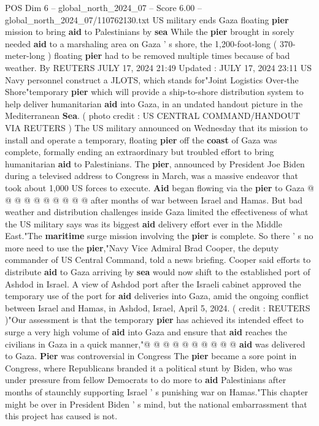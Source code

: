 \begin{textsample}{POS Dim 6 – global\_north\_2024\_07 – Score 6.00 – global\_north\_2024\_07/110762130.txt}  \label{ex:f6_pos_309}
US military ends Gaza floating \textbf{pier} mission to bring \textbf{aid} to Palestinians by \textbf{sea} While the \textbf{pier} brought in sorely needed \textbf{aid} to a marshaling area on Gaza ' s shore, the 1,200-foot-long ( 370-meter-long ) floating \textbf{pier} had to be removed multiple times because of bad weather.
By REUTERS JULY 17, 2024 21:49 Updated : JULY 17, 2024 23:11 US Navy personnel construct a JLOTS, which stands for"Joint Logistics Over-the Shore"temporary \textbf{pier} which will provide a ship-to-shore distribution system to help deliver humanitarian \textbf{aid} into Gaza, in an undated handout picture in the Mediterranean \textbf{Sea}. ( photo credit : US CENTRAL COMMAND/HANDOUT VIA REUTERS ) The US military announced on Wednesday that its mission to install and operate a temporary, floating \textbf{pier} off the \textbf{coast} of Gaza was complete, formally ending an extraordinary but troubled effort to bring humanitarian \textbf{aid} to Palestinians.
The \textbf{pier}, announced by President Joe Biden during a televised address to Congress in March, was a massive endeavor that took about 1,000 US forces to execute. \textbf{Aid} began flowing via the \textbf{pier} to Gaza @ @ @ @ @ @ @ @ @ @ after months of war between Israel and Hamas.
But bad weather and distribution challenges inside Gaza limited the effectiveness of what the US military says was its biggest \textbf{aid} delivery effort ever in the Middle East."The \textbf{maritime} surge mission involving the \textbf{pier} is complete.
So there ' s no more need to use the \textbf{pier},"Navy Vice Admiral Brad Cooper, the deputy commander of US Central Command, told a news briefing.
Cooper said efforts to distribute \textbf{aid} to Gaza arriving by \textbf{sea} would now shift to the established port of Ashdod in Israel.
A view of Ashdod port after the Israeli cabinet approved the temporary use of the port for \textbf{aid} deliveries into Gaza, amid the ongoing conflict between Israel and Hamas, in Ashdod, Israel, April 5, 2024. ( credit : REUTERS )"Our assessment is that the temporary \textbf{pier} has achieved its intended effect to surge a very high volume of \textbf{aid} into Gaza and ensure that \textbf{aid} reaches the civilians in Gaza in a quick manner,"@ @ @ @ @ @ @ @ @ @ \textbf{aid} was delivered to Gaza. \textbf{Pier} was controversial in Congress The \textbf{pier} became a sore point in Congress, where Republicans branded it a political stunt by Biden, who was under pressure from fellow Democrats to do more to \textbf{aid} Palestinians after months of staunchly supporting Israel ' s punishing war on Hamas."This chapter might be over in President Biden ' s mind, but the national embarrassment that this project has caused is not.

\end{textsample}
